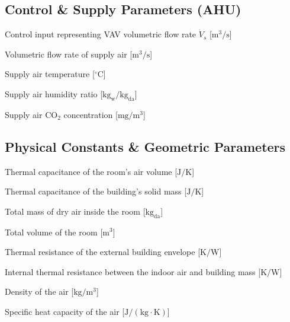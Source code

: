 \documentclass[12pt, a4paper]{article}
\begin{document}
	\subsection*{Control \& Supply Parameters (AHU)}
	\begin{description}[align=left, labelwidth=2.5cm, leftmargin=!]
		\item[$u$] Control input representing VAV volumetric flow rate $\dot{V}_s$ [$\mathrm{m^3/s}$]
		\item[$\dot{V}_s$] Volumetric flow rate of supply air [$\mathrm{m^3/s}$]
		\item[$T_s$] Supply air temperature [$^\circ\mathrm{C}$]
		\item[$W_s$] Supply air humidity ratio [$\mathrm{kg_w/kg_{da}}$]
		\item[$C_s$] Supply air $\mathrm{CO}_2$ concentration [$\mathrm{mg/m^3}$]
	\end{description}
	
	\subsection*{Physical Constants \& Geometric Parameters}
	\begin{description}[align=left, labelwidth=2.5cm, leftmargin=!]
		\item[$C_{\mathrm{air}}$] Thermal capacitance of the room's air volume [$\mathrm{J/K}$]
		\item[$C_{\mathrm{mass}}$] Thermal capacitance of the building's solid mass [$\mathrm{J/K}$]
		\item[$M_{\mathrm{air}}$] Total mass of dry air inside the room [$\mathrm{kg_{da}}$]
		\item[$V_{\mathrm{room}}$] Total volume of the room [$\mathrm{m^3}$]
		\item[$R_{\mathrm{ext}}$] Thermal resistance of the external building envelope [$\mathrm{K/W}$]
		\item[$R_{\mathrm{int}}$] Internal thermal resistance between the indoor air and building mass [$\mathrm{K/W}$]
		\item[$\rho_{\mathrm{air}}$] Density of the air [$\mathrm{kg/m^3}$]
		\item[$c_p$] Specific heat capacity of the air [$\mathrm{J/(kg \cdot K)}$]
	\end{description}
	
\end{document}
